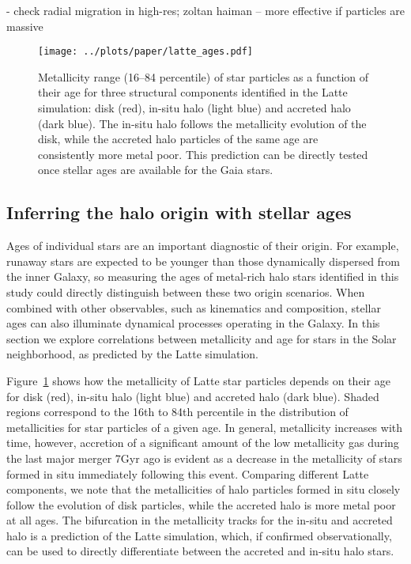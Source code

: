\documentclass[apj, twocolappendix, numberedappendix, appendixfloats]{emulateapj}
\begin{document}
- check radial migration in high-res; zoltan haiman -- more effective if particles are massive


\begin{figure}
\begin{center}
\texttt{[image: ../plots/paper/latte\_ages.pdf]}
\caption{Metallicity range (16--84 percentile) of star particles as a function of their age for three structural components identified in the Latte simulation: disk (red), in-situ halo (light blue) and accreted halo (dark blue).
The in-situ halo follows the metallicity evolution of the disk, while the accreted halo particles of the same age are consistently more metal poor.
This prediction can be directly tested once stellar ages are available for the Gaia stars.}
\label{fig:ages}
\end{center}
\end{figure}

\subsection{Inferring the halo origin with stellar ages}
\label{sec:ages}
Ages of individual stars are an important diagnostic of their origin.
For example, runaway stars are expected to be younger than those dynamically dispersed from the inner Galaxy, so measuring the ages of metal-rich halo stars identified in this study could directly distinguish between these two origin scenarios.
When combined with other observables, such as kinematics and composition, stellar ages can also illuminate dynamical processes operating in the Galaxy.
In this section we explore correlations between metallicity and age for stars in the Solar neighborhood, as predicted by the Latte simulation.

Figure~\ref{fig:ages} shows how the metallicity of Latte star particles depends on their age for disk (red), in-situ halo (light blue) and accreted halo (dark blue).
Shaded regions correspond to the 16th to 84th percentile in the distribution of metallicities for star particles of a given age.
In general, metallicity increases with time, however, accretion of a significant amount of the low metallicity gas during the last major merger 7\;Gyr ago is evident as a decrease in the metallicity of stars formed in situ immediately following this event.
Comparing different Latte components, we note that the metallicities of halo particles formed in situ closely follow the evolution of disk particles, while the accreted halo is more metal poor at all ages.
The bifurcation in the metallicity tracks for the in-situ and accreted halo is a prediction of the Latte simulation, which, if confirmed observationally, can be used to directly differentiate between the accreted and in-situ halo stars.
\end{document}
